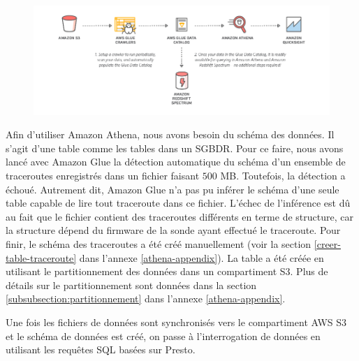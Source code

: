 \begin{figure}[H]
	\centering
	\captionsetup{justification=centering}
	\includegraphics[width=1\linewidth]{illustrations/glue_crawler}
	\caption{}
	\label{fig:gluecrawler}
\end{figure}


Afin d'utiliser Amazon Athena, nous avons besoin du schéma des données. Il s'agit d'une table comme les tables dans un SGBDR. Pour ce faire, 
nous avons lancé  avec Amazon Glue  la détection automatique du schéma d'un ensemble de  traceroutes enregistrés dans un fichier faisant $500$ MB. Toutefois, la détection a échoué. Autrement dit, Amazon Glue n'a pas pu inférer le schéma d'une seule table capable de lire tout traceroute dans ce fichier.  L'échec de l'inférence est dû au fait que le fichier contient des traceroutes différents en terme de structure, car la structure dépend du firmware de la sonde ayant effectué le traceroute.
 Pour finir, le schéma des traceroutes a été créé manuellement (voir la section \ref{creer-table-traceroute} dans l'annexe \ref{athena-appendix}). La table a été créée en utilisant le partitionnement des données dans un compartiment S3. Plus de détails sur le partitionnement sont données dans la section \ref{subsubsection:partitionnement} dans l'annexe \ref{athena-appendix}.


Une fois les fichiers de données sont synchronisés vers le compartiment AWS S3 et le schéma  de données est créé, on passe à l'interrogation de données en utilisant les requêtes SQL basées sur Presto.  

